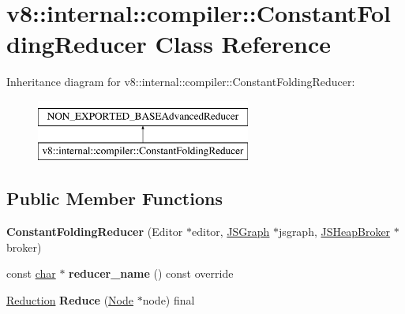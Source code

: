 \hypertarget{classv8_1_1internal_1_1compiler_1_1ConstantFoldingReducer}{}\section{v8\+:\+:internal\+:\+:compiler\+:\+:Constant\+Folding\+Reducer Class Reference}
\label{classv8_1_1internal_1_1compiler_1_1ConstantFoldingReducer}
Inheritance diagram for v8\+:\+:internal\+:\+:compiler\+:\+:Constant\+Folding\+Reducer\+:\begin{figure}[H]
\begin{center}
\leavevmode
\includegraphics[height=2.000000cm]{classv8_1_1internal_1_1compiler_1_1ConstantFoldingReducer}
\end{center}
\end{figure}
\subsection*{Public Member Functions}
\begin{DoxyCompactItemize}
\item 
\mbox{\label{classv8_1_1internal_1_1compiler_1_1ConstantFoldingReducer_a459295f7b6c7b086b34e4aa215049269}} 
{\bfseries Constant\+Folding\+Reducer} (Editor $\ast$editor, \mbox{\hyperlink{classv8_1_1internal_1_1compiler_1_1JSGraph}{J\+S\+Graph}} $\ast$jsgraph, \mbox{\hyperlink{classv8_1_1internal_1_1compiler_1_1JSHeapBroker}{J\+S\+Heap\+Broker}} $\ast$broker)
\item 
\mbox{\label{classv8_1_1internal_1_1compiler_1_1ConstantFoldingReducer_a78f2d112b95e860d18e62597d8f4a770}} 
const \mbox{\hyperlink{classchar}{char}} $\ast$ {\bfseries reducer\+\_\+name} () const override
\item 
\mbox{\label{classv8_1_1internal_1_1compiler_1_1ConstantFoldingReducer_a6eb5bf395bc1c82d4de26babf6e4d341}} 
\mbox{\hyperlink{classv8_1_1internal_1_1compiler_1_1Reduction}{Reduction}} {\bfseries Reduce} (\mbox{\hyperlink{classv8_1_1internal_1_1compiler_1_1Node}{Node}} $\ast$node) final
\end{DoxyCompactItemize}


